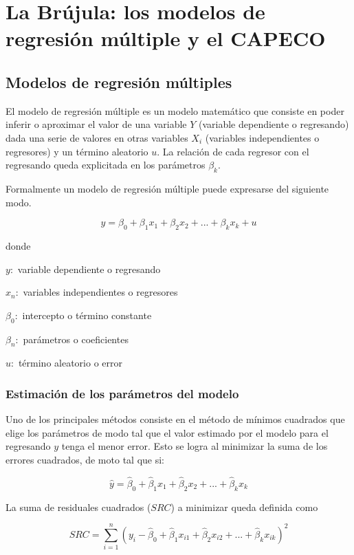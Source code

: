 	
	
	\section{La Brújula: los modelos de regresión múltiple y el CAPECO}\label{cap2-brujula}

\subsection{Modelos de regresión múltiples}

El modelo de regresión múltiple \cite{wooldridge,hastie} es un modelo matemático que consiste en poder inferir o aproximar el valor de una variable $Y$ (variable dependiente o regresando) dada una serie de valores en otras variables $X_i$ (variables independientes o regresores) y un término aleatorio $u$. La relación de cada regresor con el regresando queda explicitada en los parámetros $\beta_k$.

Formalmente un modelo de regresión múltiple puede expresarse del siguiente modo.

$$y = \beta_0 + \beta_1 x_1 + \beta_2 x_2 + ... + \beta_k x_k + u$$

donde

$y:$ variable dependiente o regresando

$x_n:$ variables independientes o regresores

$\beta_0:$ intercepto o término constante 

$\beta_n:$ parámetros o coeficientes 

$u:$ término aleatorio o error


\subsubsection{Estimación de los parámetros del modelo} 

Uno de los principales métodos consiste en el método de mínimos cuadrados que elige los parámetros de modo tal que el valor estimado por el modelo para el regresando $y$ tenga el menor error. Esto se logra al minimizar la suma de los errores cuadrados, de moto tal que si:

$$\hat{y} = \hat{\beta}_0 + \hat{\beta}_1 x_1 + \hat{\beta}_2 x_2 + ... + \hat{\beta}_k x_k$$

La suma de residuales cuadrados ($SRC$) a minimizar queda definida como 

$$SRC = \sum_{i=1}^{n}(y_i - \hat{\beta}_0 + \hat{\beta}_1 x_{i1} + \hat{\beta}_2 x_{i2} + ... + \hat{\beta}_k x_{ik})^2$$

